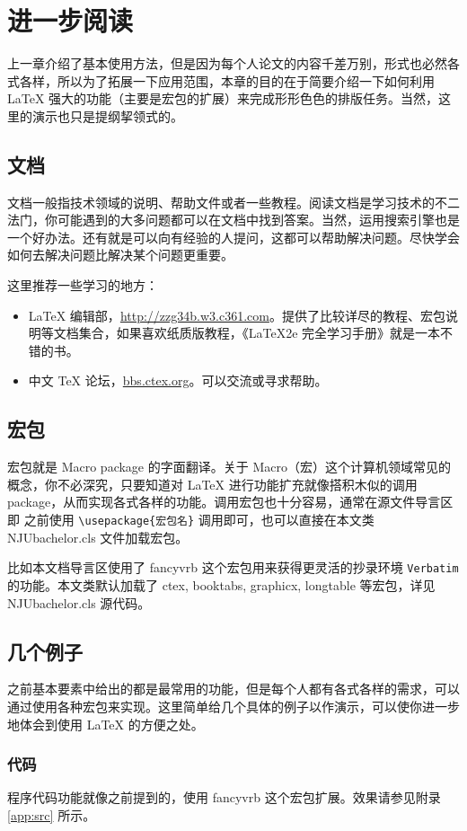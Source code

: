 \chapter{进一步阅读}
上一章介绍了基本使用方法，但是因为每个人论文的内容千差万别，形式也必然各式各样，所以为了拓展一下应用范围，本章的目的在于简要介绍一下如何利用 LaTeX 强大的功能（主要是宏包的扩展）来完成形形色色的排版任务。当然，这里的演示也只是提纲挈领式的。

\section{文档}
文档一般指技术领域的说明、帮助文件或者一些教程。阅读文档是学习技术的不二法门，你可能遇到的大多问题都可以在文档中找到答案。当然，运用搜索引擎也是一个好办法。还有就是可以向有经验的人提问，这都可以帮助解决问题。尽快学会如何去解决问题比解决某个问题更重要。

这里推荐一些学习的地方：
\begin{itemize}
	\item LaTeX 编辑部，\url{http://zzg34b.w3.c361.com}。提供了比较详尽的教程、宏包说明等文档集合，如果喜欢纸质版教程，《LaTeX2e 完全学习手册》就是一本不错的书。
	\item 中文 TeX 论坛，\url{bbs.ctex.org}。可以交流或寻求帮助。
\end{itemize}

\section{宏包}
宏包就是 Macro package 的字面翻译。关于 Macro（宏）这个计算机领域常见的概念，你不必深究，只要知道对 LaTeX 进行功能扩充就像搭积木似的调用 package，从而实现各式各样的功能\cite{latex2e}。调用宏包也十分容易，通常在源文件导言区即 \verb|| 之前使用 \verb|\usepackage{宏包名}| 调用即可，也可以直接在本文类 NJUbachelor.cls 文件加载宏包。

比如本文档导言区使用了 fancyvrb 这个宏包用来获得更灵活的抄录环境 \verb|Verbatim| 的功能。本文类默认加载了 ctex, booktabs, graphicx, longtable 等宏包，详见 NJUbachelor.cls 源代码。

\section{几个例子}
之前基本要素中给出的都是最常用的功能，但是每个人都有各式各样的需求，可以通过使用各种宏包来实现。这里简单给几个具体的例子以作演示，可以使你进一步地体会到使用 LaTeX 的方便之处。

\subsection{代码}
程序代码功能就像之前提到的，使用 fancyvrb 这个宏包扩展。效果请参见附录 \ref{app:src} 所示。

